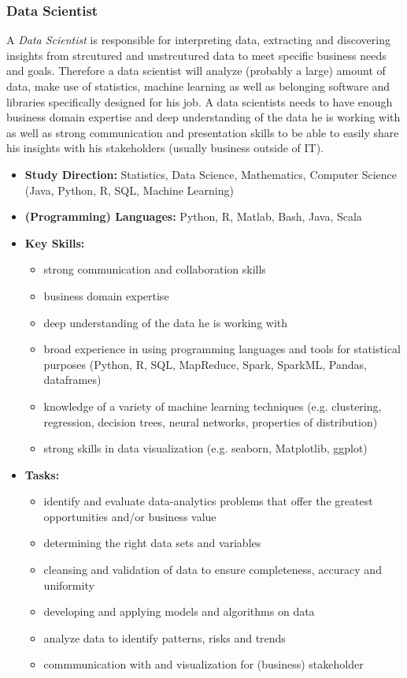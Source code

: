 \subsubsection{Data Scientist}
\label{bd_bdib_roles_ds}
A \textit{Data Scientist} is responsible for interpreting data, extracting and discovering insights from strcutured and unstrcutured data to meet specific business needs and goals. Therefore a data scientist will analyze (probably a large) amount of data, make use of statistics, machine learning as well as belonging software and libraries specifically designed for his job. A data scientists needs to have enough business domain expertise and deep understanding of the data he is working with as well as strong communication and presentation skills to be able to easily share his insights with his stakeholders (usually business outside of IT).\\

\begin{itemize}
	\item \textbf{Study Direction:} Statistics, Data Science, Mathematics, Computer Science (Java, Python, R, SQL, Machine Learning) \\
	\item \textbf{(Programming) Languages:} Python, R, Matlab, Bash, Java, Scala\\
	\item \textbf{Key Skills:} 
	\begin{itemize}
	\item strong communication and collaboration skills
	\item business domain expertise
	\item deep understanding of the data he is working with
	\item broad experience in using programming languages and tools for statistical purposes (Python, R, SQL, MapReduce, Spark, SparkML, Pandas, dataframes)
	\item knowledge of a variety of machine learning techniques (e.g. clustering, regression, decision trees, neural networks, properties of distribution)
	\item strong skills in data visualization (e.g. seaborn, Matplotlib, ggplot)\\
	\end{itemize} 
	\item \textbf{Tasks:} 
	\begin{itemize}
	\item identify and evaluate data-analytics problems that offer the greatest opportunities and/or business value
	\item determining the right data sets and variables
	\item cleansing and validation of data to ensure completeness, accuracy and uniformity
	\item developing and applying models and algorithms on data 
	\item analyze data to identify patterns, risks and trends
	\item commmunication with and visualization for (business) stakeholder\\
	\end{itemize} 
\end{itemize}


